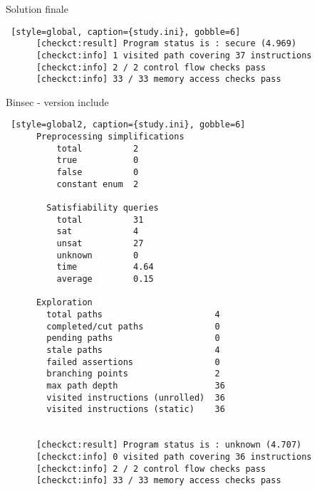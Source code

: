 \documentclass[A4,svgnames,9pt,aspectratio=169]{beamer}
\begin{document}

\begin{frame}[fragile]{Solution finale}
  \begin{lstlisting} [style=global, caption={study.ini}, gobble=6]              
      [checkct:result] Program status is : secure (4.969)
      [checkct:info] 1 visited path covering 37 instructions
      [checkct:info] 2 / 2 control flow checks pass
      [checkct:info] 33 / 33 memory access checks pass
    \end{lstlisting}
\end{frame}


\begin{frame}[fragile]{Binsec - version include}
    \begin{lstlisting} [style=global2, caption={study.ini}, gobble=6]
      Preprocessing simplifications
          total          2
          true           0
          false          0
          constant enum  2
        
        Satisfiability queries
          total          31
          sat            4
          unsat          27
          unknown        0
          time           4.64
          average        0.15
        
      Exploration
        total paths                      4
        completed/cut paths              0
        pending paths                    0
        stale paths                      4
        failed assertions                0
        branching points                 2
        max path depth                   36
        visited instructions (unrolled)  36
        visited instructions (static)    36
                  
                
      [checkct:result] Program status is : unknown (4.707)
      [checkct:info] 0 visited path covering 36 instructions
      [checkct:info] 2 / 2 control flow checks pass
      [checkct:info] 33 / 33 memory access checks pass
    \end{lstlisting}
\end{frame}

\end{document}
